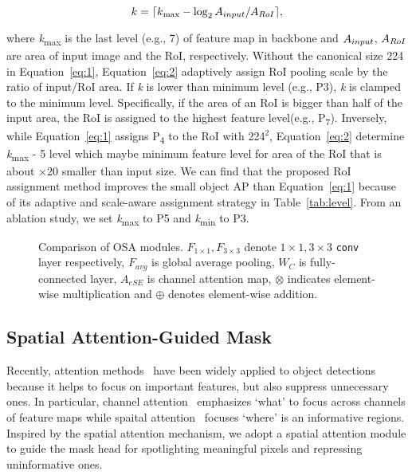 \documentclass[10pt,twocolumn,letterpaper]{article}
\DeclarePairedDelimiter\ceil{\lceil}{\rceil}
\begin{document}
\begin{equation} \label{eq:2}
k = \ceil{k\textsubscript{max} - \log_2 \mathnormal{A}_{input}/\mathnormal{A}_{RoI}},
\end{equation}

\noindent
where \textit{k}\textsubscript{max} is the last level (e.g., 7) of feature map in backbone and $\mathnormal{A}_{input}$, $\mathnormal{A}_{RoI}$ are area of input image and the RoI, respectively. 
Without the canonical size 224 in Equation~\ref{eq:1}, Equation~\ref{eq:2} adaptively assign RoI pooling scale by the ratio of input/RoI area. 
If \textit{k} is lower than minimum level (e.g., P3), \textit{k} is clamped to the minimum level. 
Specifically,  if the area of an RoI is bigger than half of the input area, the RoI is assigned to the highest feature level(e.g., P\textsubscript{7}). 
Inversely, while Equation~\ref{eq:1} assigns P\textsubscript{4} to the RoI with 224$^2$, Equation~\ref{eq:2} determine \textit{k}\textsubscript{max} - 5 level which maybe minimum feature level for area of the RoI that is about $\times20$ smaller than input size. 
We can find that the proposed RoI assignment method improves the small object AP than Equation~\ref{eq:1} because of its adaptive and scale-aware assignment strategy in Table~\ref{tab:level}.
From an ablation study, we set \textit{k}\textsubscript{max} to P5 and \textit{k}\textsubscript{min} to P3.

\begin{figure*}[t]
\centering
{}
\caption{Comparison of OSA modules. $F_{1\times1}, F_{3\times3}$ denote $1\times1, 3\times3$ \texttt{conv} layer respectively, $F_{avg}$ is global average pooling, $W_C$ is fully-connected layer, $A_{eSE}$ is channel attention map, $\otimes$ indicates element-wise multiplication and $\oplus$ denotes element-wise addition.}
\label{fig:osa}
\vspace{-0.5cm}
\end{figure*}


\subsection{Spatial Attention-Guided Mask}
Recently, attention methods~\cite{hu2018squeeze,woo2018cbam,Zhu_2019_ICCV,Qin_2019_ICCV} have been widely applied to object detections because it helps to focus on important features, but also suppress unnecessary ones.
In particular, channel attention~\cite{hu2018squeeze,hu2018gather} emphasizes `what' to focus across channels of feature maps while spaital attention~\cite{woo2018cbam,chen2017sca} focuses `where' is an informative regions.
Inspired by the spatial attention mechanism, we adopt a spatial attention module to guide the mask head for spotlighting meaningful pixels and repressing uninformative ones.
\end{document}
